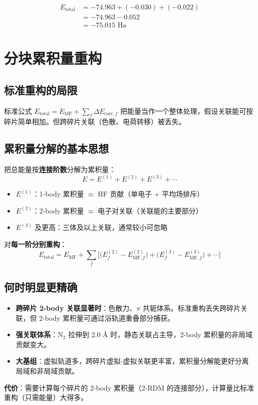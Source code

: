 \documentclass[11pt,a4paper]{article}
\begin{document}
\begin{align}
  E_{\text{total}} &= -74.963 + (-0.030) + (-0.022) \\
  &= -74.963 - 0.052 \\
  &= \boxed{-75.015 \text{ Ha}}
\end{align}

\section*{分块累积量重构}

\subsection*{标准重构的局限}

标准公式 $E_{\text{total}} = E_{\text{MF}} + \sum_f \Delta E_{\text{corr},f}$ 把能量当作一个整体处理，假设关联能可按碎片简单相加。但跨碎片关联（色散、电荷转移）被丢失。

\subsection*{累积量分解的基本思想}

把总能量按\textbf{连接阶数}分解为累积量：
$$E = E^{(1)} + E^{(2)} + E^{(3)} + \cdots$$

\begin{itemize}
  \item $E^{(1)}$：1-body 累积量 $\approx$ HF 贡献（单电子 + 平均场排斥）
  \item $E^{(2)}$：2-body 累积量 $\approx$ 电子对关联（关联能的主要部分）
  \item $E^{(3)}$ 及更高：三体及以上关联，通常较小可忽略
\end{itemize}

对\textbf{每一阶分别重构}：
$$E_{\text{total}} = E_{\text{MF}} + \sum_f \Big[\big(E^{(2)}_f - E^{(2)}_{\text{MF},f}\big) + \big(E^{(3)}_f - E^{(3)}_{\text{MF},f}\big) + \cdots\Big]$$

\subsection*{何时明显更精确}

\begin{itemize}
  \item \textbf{跨碎片 2-body 关联显著时}：色散力、$\pi$ 共轭体系。标准重构丢失跨碎片关联，但 2-body 累积量可通过浴轨道重叠部分捕获。
  \item \textbf{强关联体系}：N$_2$ 拉伸到 2.0 \AA{} 时，静态关联占主导，2-body 累积量的非局域贡献变大。
  \item \textbf{大基组}：虚拟轨道多，跨碎片虚拟-虚拟关联更丰富，累积量分解能更好分离局域和非局域贡献。
\end{itemize}

\textbf{代价}：需要计算每个碎片的 2-body 累积量（2-RDM 的连接部分），计算量比标准重构（只需能量）大得多。
\end{document}
